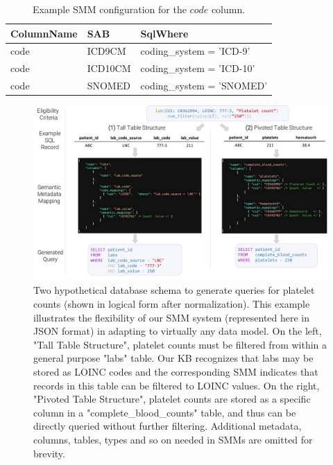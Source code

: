 \documentclass[../main.tex]{subfiles}
\begin{document}
\def\arraystretch{0.8}
\begin{table}[h!]
\centering
\begin{tabular}{l l l}
 \toprule
 \textbf{ColumnName} & \textbf{SAB} & \textbf{SqlWhere} \\
 \hline
    code & ICD9CM  & coding\_system = 'ICD-9' \\
    code & ICD10CM & coding\_system = 'ICD-10' \\
    code & SNOMED  & coding\_system = 'SNOMED' \\
 \hline
\end{tabular}
\caption{Example SMM configuration for the $code$ column. } 
\label{tbl_smm_column_config}
\end{table}

\begin{figure}[H]
  \includegraphics[scale=0.47]{Figures/6_smm/leafai_smm.pdf}  
\caption{Two hypothetical database schema to generate queries for platelet counts (shown in logical form after normalization). This example illustrates the flexibility of our SMM system (represented here in JSON format) in adapting to virtually any data model. On the left, "Tall Table Structure", platelet counts must be filtered from within a general purpose "labs" table. Our KB recognizes that labs may be stored as LOINC codes and the corresponding SMM indicates that records in this table can be filtered to LOINC values. On the right, "Pivoted Table Structure", platelet counts are stored as a specific column in a "complete\_blood\_counts" table, and thus can be directly queried without further filtering. Additional metadata, columns, tables, types and so on needed in SMMs are omitted for brevity.}
\label{fig_leafai_smm}
\end{figure}
\end{document}

